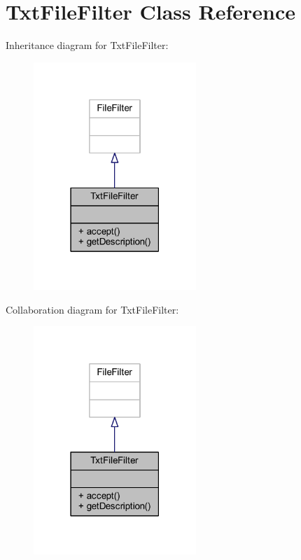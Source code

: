\hypertarget{class_txt_file_filter}{\section{Txt\-File\-Filter Class Reference}
\label{class_txt_file_filter}
}


Inheritance diagram for Txt\-File\-Filter\-:\nopagebreak
\begin{figure}[H]
\begin{center}
\leavevmode
\includegraphics[width=174pt]{class_txt_file_filter__inherit__graph}
\end{center}
\end{figure}


Collaboration diagram for Txt\-File\-Filter\-:\nopagebreak
\begin{figure}[H]
\begin{center}
\leavevmode
\includegraphics[width=174pt]{class_txt_file_filter__coll__graph}
\end{center}
\end{figure}
